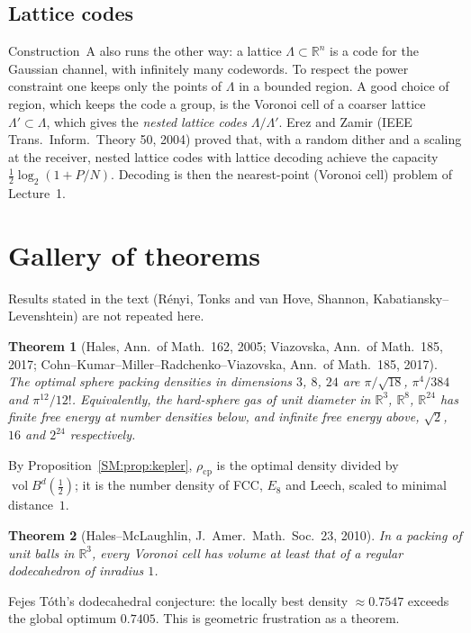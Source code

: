 \documentclass[11pt,openany]{book}
\theoremstyle{plain}
\newtheorem{theorem}{Theorem}[chapter]
\theoremstyle{definition}
\theoremstyle{remark}
\newcommand{\R}{\mathbb{R}}
\newcommand{\vol}{\operatorname{vol}}
\newcommand{\Ball}{B}                  %
\begin{document}
\subsection{Lattice codes}

Construction~A also runs the other way: a lattice $\Lambda\subset\R^n$ is a code for the Gaussian channel,
with infinitely many codewords. To respect the power constraint one keeps only the points of $\Lambda$ in a
bounded region. A good choice of region, which keeps the code a group, is the Voronoi cell of a coarser lattice $\Lambda'\subset\Lambda$,
which gives the \emph{nested lattice codes} $\Lambda/\Lambda'$. Erez and Zamir (IEEE Trans.\ Inform.\ Theory 50,
2004) proved that, with a random dither and a scaling at the receiver, nested lattice codes with
lattice decoding achieve the capacity $\frac12\log_2(1+P/N)$. Decoding is then
the nearest-point (Voronoi cell) problem of Lecture~1.

\section{Gallery of theorems}
\label{SM:sec:gallery}

Results stated in the text (R\'enyi, Tonks and van Hove, Shannon, Kabatiansky--Levenshtein) are not
repeated here.

\begin{theorem}[Hales, Ann.\ of Math.\ 162, 2005; Viazovska, Ann.\ of Math.\ 185, 2017; Cohn--Kumar--Miller--Radchenko--Viazovska, Ann.\ of Math.\ 185, 2017]
The optimal sphere packing densities in dimensions $3$, $8$, $24$ are $\pi/\sqrt{18}$, $\pi^4/384$ and
$\pi^{12}/12!$. Equivalently, the hard-sphere gas of unit diameter in $\R^3$, $\R^8$, $\R^{24}$ has finite
free energy at number densities below, and infinite free energy above, $\sqrt2$, $16$ and $2^{24}$ respectively.
\end{theorem}
\noindent By Proposition~\ref{SM:prop:kepler}, $\rho_{\mathrm{cp}}$ is the optimal density divided by
$\vol\Ball^d(\frac12)$; it is the number density of FCC, $E_8$ and Leech, scaled to minimal distance~$1$.

\begin{theorem}[Hales--McLaughlin, J.~Amer.\ Math.\ Soc.\ 23, 2010]
In a packing of unit balls in $\R^3$, every Voronoi cell has volume at least that of a regular dodecahedron
of inradius $1$.
\end{theorem}
\noindent Fejes T\'oth's dodecahedral conjecture: the locally best density $\approx0.7547$ exceeds the global
optimum $0.7405$. This is geometric frustration as a theorem.
\end{document}
